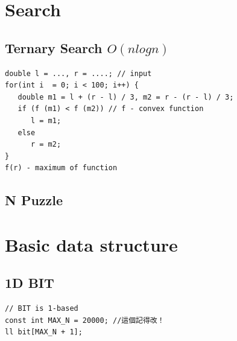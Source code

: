 \documentclass[10pt,oneside]{article}
\begin{document}
\begin{landscape}
\begin{multicols}{2}




\section{Search}

\subsection{Ternary Search $O(nlogn)$}

\begin{verbatim}
double l = ..., r = ....; // input
for(int i  = 0; i < 100; i++) {
   double m1 = l + (r - l) / 3, m2 = r - (r - l) / 3;
   if (f (m1) < f (m2)) // f - convex function
      l = m1;
   else
      r = m2;
}
f(r) - maximum of function
\end{verbatim}

\subsection{N Puzzle}



\section{Basic data structure}

\subsection{1D BIT}

\begin{verbatim}
// BIT is 1-based
const int MAX_N = 20000; //這個記得改！
ll bit[MAX_N + 1];


\end{verbatim}
\end{multicols}
\end{landscape}
\end{document}
